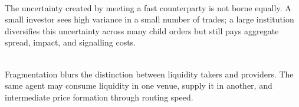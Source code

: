 \documentclass[a4paper,oneside,openany]{book}
\begin{document}
\begin{caveat} \\
The uncertainty created by meeting a fast counterparty is not borne equally. A small investor sees high variance in a small number of trades; a large institution diversifies this uncertainty across many child orders but still pays aggregate spread, impact, and signalling costs.
\end{caveat}

\begin{caveat} \\
Fragmentation blurs the distinction between liquidity takers and providers. The same agent may consume liquidity in one venue, supply it in another, and intermediate price formation through routing speed.
\end{caveat}
\end{document}
